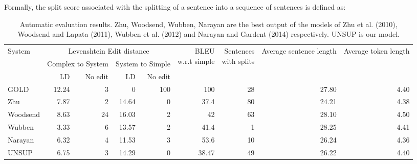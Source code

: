 \documentclass[11pt,a4paper]{article}
\begin{document}
Formally, the split score  associated with the splitting of
a sentence  into a sequence of sentences  is defined
as:

\begin{table*}[htbp]
  \begin{center}
    \begin{footnotesize}
      \begin{tabular}{|p{1.2cm}|rr|rr|r|r|r|r|}\hline
        
        \multirow{3}{*}{System} &
        \multicolumn{4}{|c|}{\parbox{4cm}{Levenshtein Edit distance}}
        & \multirow{3}{*}{\parbox{1.5cm}{BLEU \\ w.r.t simple}} &
        \multirow{3}{*}{\parbox{1.3cm}{Sentences \\ with splits}} &
        \multirow{3}{*}{\parbox{1.2cm}{Average sentence length}} &
        \multirow{3}{*}{\parbox{1.2cm}{Average token length}}
        \\ \cline{2-5}
        & \multicolumn{2}{|c|}{\parbox{2cm}{Complex to System}} &
        \multicolumn{2}{|c|}{\parbox{2cm}{System to Simple}} & & & &\\ \cline{2-5}
        & LD & No edit & LD & No edit & & &  & \\ \hline
        GOLD & 12.24 & 3 & 0 & 100 & 100 & 28 & 27.80 & 4.40 \\ 
        Zhu & 7.87 & 2 & 14.64 & 0 & 37.4 & 80 & 24.21 & 4.38\\
        Woodsend & 8.63 & 24 & 16.03 & 2 & 42 & 63 & 28.10 & 4.50\\
        Wubben & 3.33 & 6 & 13.57 & 2 & 41.4 & 1 & 28.25 & 4.41\\
        Narayan & 6.32 & 4 & 11.53 & 3 & 53.6 & 10 & 26.24 & 4.36\\\hline
        UNSUP & 6.75 & 3 & 14.29 & 0 & 38.47 & 49 & 26.22 & 4.40 \\\hline
      \end{tabular}
      \caption{\small Automatic evaluation results.  Zhu, Woodsend,
        Wubben, Narayan are the best output of the models of Zhu et
        al. (2010), Woodsend and Lapata (2011), Wubben et al. (2012)
        and Narayan and Gardent (2014) respectively. UNSUP is our
        model.}\label{tab:autoeval}
      \vspace{-0.5cm}
    \end{footnotesize}    
  \end{center}
\end{table*}

{
  \footnotesize
  \vspace{-0.4cm}
  
  \vspace{-0.3cm}
}
\end{document}
